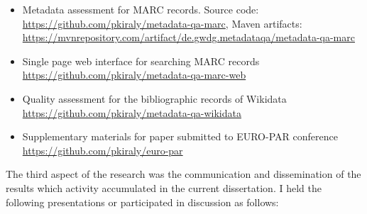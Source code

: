 \begin{itemize}
\item Metadata assessment for MARC records. Source code: \url{https://github.com/pkiraly/metadata-qa-marc}, Maven artifacts: \url{https://mvnrepository.com/artifact/de.gwdg.metadataqa/metadata-qa-marc} 
\item Single page web interface for searching MARC records \url{https://github.com/pkiraly/metadata-qa-marc-web}
\item Quality assessment for the bibliographic records of Wikidata \url{https://github.com/pkiraly/metadata-qa-wikidata}
\item Supplementary materials for paper submitted to EURO-PAR conference \url{https://github.com/pkiraly/euro-par}
\end{itemize}

The third aspect of the research was the communication and  dissemination of the results which activity accumulated in the current dissertation. I held the following presentations or participated in discussion as follows:

